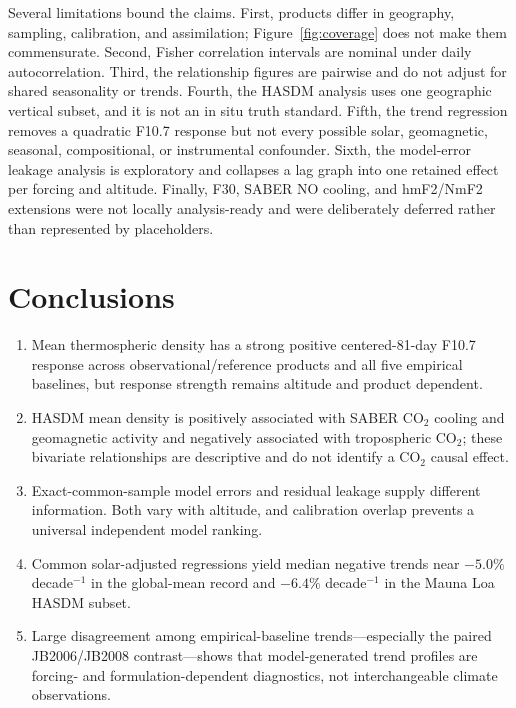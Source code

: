 \documentclass[11pt]{article}
\begin{document}
Several limitations bound the claims.  First, products differ in geography,
sampling, calibration, and assimilation; Figure~\ref{fig:coverage} does not
make them commensurate.  Second, Fisher correlation intervals are nominal under
daily autocorrelation.  Third, the relationship figures are pairwise and do not
adjust for shared seasonality or trends.  Fourth, the HASDM analysis uses one
geographic vertical subset, and it is not an in situ truth standard.  Fifth,
the trend regression removes a quadratic F10.7 response but not every possible
solar, geomagnetic, seasonal, compositional, or instrumental confounder.  Sixth,
the model-error leakage analysis is exploratory and collapses a lag graph into
one retained effect per forcing and altitude.  Finally, F30, SABER NO cooling,
and hmF2/NmF2 extensions were not locally analysis-ready and were deliberately
deferred rather than represented by placeholders.

\section{Conclusions}

\begin{enumerate}
  \item Mean thermospheric density has a strong positive centered-81-day F10.7
  response across observational/reference products and all five empirical
  baselines, but response strength remains altitude and product dependent.
  \item HASDM mean density is positively associated with SABER CO$_2$ cooling
  and geomagnetic activity and negatively associated with tropospheric CO$_2$;
  these bivariate relationships are descriptive and do not identify a CO$_2$
  causal effect.
  \item Exact-common-sample model errors and residual leakage supply different
  information.  Both vary with altitude, and calibration overlap prevents a
  universal independent model ranking.
  \item Common solar-adjusted regressions yield median negative trends near
  $-5.0\%$ decade$^{-1}$ in the global-mean record and $-6.4\%$ decade$^{-1}$
  in the Mauna Loa HASDM subset.
  \item Large disagreement among empirical-baseline trends---especially the
  paired JB2006/JB2008 contrast---shows that model-generated trend profiles are
  forcing- and formulation-dependent diagnostics, not interchangeable climate
  observations.
\end{enumerate}
\end{document}
